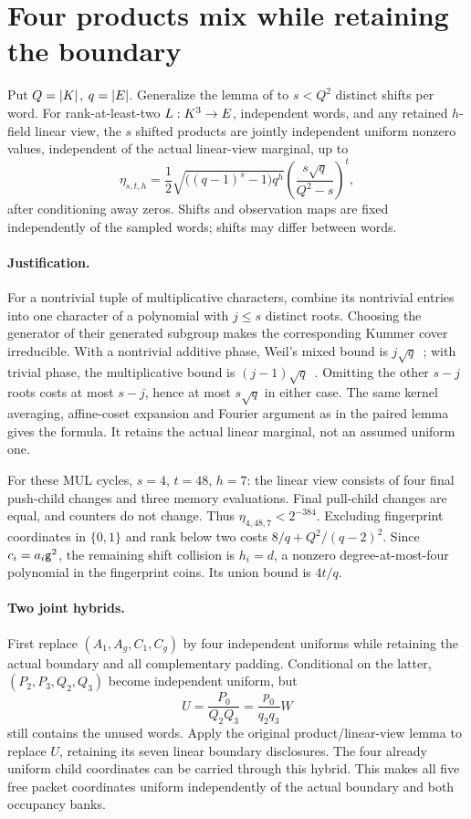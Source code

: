 \documentclass[11pt]{article}
\begin{document}
\section{Four products mix while retaining the boundary}

Put $Q=|K|$, $q=|E|$. Generalize the lemma of  to $s<Q^2$ distinct shifts per word. For rank-at-least-two $L:K^3\to E$, independent words, and any retained $h$-field linear view, the $s$ shifted products are jointly independent uniform nonzero values, independent of the actual linear-view marginal, up to
\[
 \eta_{s,t,h}=\frac12\sqrt{\bigl((q-1)^s-1\bigr)q^h}
 \left(\frac{s\sqrt q}{Q^2-s}\right)^t,
\]
after conditioning away zeros. Shifts and observation maps are fixed independently of the sampled words; shifts may differ between words.

\paragraph{Justification.} For a nontrivial tuple of multiplicative characters, combine its nontrivial entries into one character of a polynomial with $j\le s$ distinct roots. Choosing the generator of their generated subgroup makes the corresponding Kummer cover irreducible. With a nontrivial additive phase, Weil's mixed bound is $j\sqrt q$~\cite{winger}; with trivial phase, the multiplicative bound is $(j-1)\sqrt q$~\cite{kowalski}. Omitting the other $s-j$ roots costs at most $s-j$, hence at most $s\sqrt q$ in either case. The same kernel averaging, affine-coset expansion and Fourier argument as in the paired lemma gives the formula. It retains the actual linear marginal, not an assumed uniform one.

For these MUL cycles, $s=4$, $t=48$, $h=7$: the linear view consists of four final push-child changes and three memory evaluations. Final pull-child changes are equal, and counters do not change. Thus $\eta_{4,48,7}<2^{-384}$. Excluding fingerprint coordinates in $\{0,1\}$ and rank below two costs $8/q+Q^2/(q-2)^2$. Since $c_i=a_i\mathsf{g}^2$, the remaining shift collision is $h_i=d$, a nonzero degree-at-most-four polynomial in the fingerprint coins. Its union bound is $4t/q$.

\paragraph{Two joint hybrids.} First replace $(A_1,A_g,C_1,C_g)$ by four independent uniforms while retaining the actual boundary and all complementary padding. Conditional on the latter, $(P_2,P_3,Q_2,Q_3)$ become independent uniform, but
\[
 U=\frac{P_0}{Q_2Q_3}=\frac{p_0}{q_2q_3}W
\]
still contains the unused words. Apply the original product/linear-view lemma to replace $U$, retaining its seven linear boundary disclosures. The four already uniform child coordinates can be carried through this hybrid. This makes all five free packet coordinates uniform independently of the actual boundary and both occupancy banks.
\end{document}
